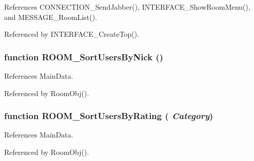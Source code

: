 References CONNECTION\_\-SendJabber(), INTERFACE\_\-ShowRoomMenu(), and MESSAGE\_\-RoomList().

Referenced by INTERFACE\_\-CreateTop().
\subsubsection[ROOM\_\-SortUsersByNick]{\setlength{\rightskip}{0pt plus 5cm}function ROOM\_\-SortUsersByNick ()}\label{room_2room_8js_bf8006e7555a26d703c26d5251381d96}




References MainData.

Referenced by RoomObj().
\subsubsection[ROOM\_\-SortUsersByRating]{\setlength{\rightskip}{0pt plus 5cm}function ROOM\_\-SortUsersByRating ( {\em Category})}\label{room_2room_8js_99971ae4c58178caa43079c9214db58d}




References MainData.

Referenced by RoomObj().